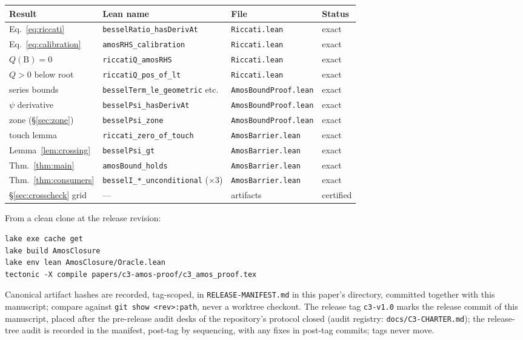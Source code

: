 \documentclass[11pt]{article}
\newcommand{\lean}[1]{\texttt{#1}}
\newcommand{\RHS}{\mathrm{B}}
\begin{document}
\begin{center}
\footnotesize
\begin{tabular}{@{}llll@{}}
\toprule
Result & Lean name & File & Status \\
\midrule
Eq.~\eqref{eq:riccati} & \lean{besselRatio\_hasDerivAt} & \lean{Riccati.lean} & exact \\
Eq.~\eqref{eq:calibration} & \lean{amosRHS\_calibration} & \lean{Riccati.lean} & exact \\
$Q(\RHS)=0$ & \lean{riccatiQ\_amosRHS} & \lean{Riccati.lean} & exact \\
$Q>0$ below root & \lean{riccatiQ\_pos\_of\_lt} & \lean{Riccati.lean} & exact \\
series bounds & \lean{besselTerm\_le\_geometric} etc. & \lean{AmosBoundProof.lean} & exact \\
$\psi$ derivative & \lean{besselPsi\_hasDerivAt} & \lean{AmosBoundProof.lean} & exact \\
zone (\S\ref{sec:zone}) & \lean{besselPsi\_zone} & \lean{AmosBoundProof.lean} & exact \\
touch lemma & \lean{riccati\_zero\_of\_touch} & \lean{AmosBarrier.lean} & exact \\
Lemma~\ref{lem:crossing} & \lean{besselPsi\_gt} & \lean{AmosBarrier.lean} & exact \\
Thm.~\ref{thm:main} & \lean{amosBound\_holds} & \lean{AmosBarrier.lean} & exact \\
Thm.~\ref{thm:consumers} & \lean{besselI\_*\_unconditional} ($\times 3$) & \lean{AmosBarrier.lean} & exact \\
\S\ref{sec:crosscheck} grid & --- & \cite{ErikssonC2} artifacts & certified \\
\bottomrule
\end{tabular}
\end{center}

\medskip
\noindent From a clean clone at the release revision:
\begin{verbatim}
lake exe cache get
lake build AmosClosure
lake env lean AmosClosure/Oracle.lean
tectonic -X compile papers/c3-amos-proof/c3_amos_proof.tex
\end{verbatim}
Canonical artifact hashes are recorded, tag-scoped, in
\lean{RELEASE-MANIFEST.md} in this paper's directory, committed
together with this manuscript; compare against
\lean{git show <rev>:path}, never a worktree checkout.  The release
tag \lean{c3-v1.0} marks the release commit of this manuscript,
placed after the pre-release audit desks of the repository's
protocol closed (audit registry: \lean{docs/C3-CHARTER.md}); the
release-tree audit is recorded in the manifest, post-tag by
sequencing, with any fixes in post-tag commits; tags never move.
\end{document}
